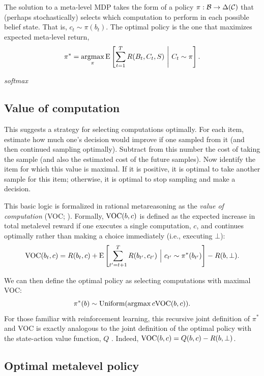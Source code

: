 The solution to a meta-level MDP takes the form of a policy $\pi: \mathcal{B} \rightarrow \Delta(\mathcal{C})$ that (perhaps stochastically) selects which computation to perform in each possible belief state. That is, $c_t \sim \pi(b_t)$. The optimal policy is the one that maximizes expected meta-level return,
%
\begin{equation}\label{eq:optimal-policy}
  \pi^* = \operatorname*{argmax}_\pi \operatorname*{E} \left[ 
    \sum_{t=1}^T R(B_t, C_t, S)
   \ \middle\vert\ 
    C_t \sim \pi
   \right].
\end{equation}



 \emph{softmax}

\subsection{Value of computation}

This suggests a strategy for selecting computations optimally. For each item, estimate how much one's decision would improve if one sampled from it (and then continued sampling optimally). Subtract from this number the cost of taking the sample (and also the estimated cost of the future samples). Now identify the item for which this value is maximal. If it is positive, it is optimal to take another sample for this item; otherwise, it is optimal to stop sampling and make a decision.

This basic logic is formalized in rational metareasoning as the \textit{value of computation} (VOC; \citealp{russell1991principles}). Formally, $\text{VOC}(b, c)$ is defined as the expected increase in total metalevel reward if one executes a single computation, $c$, and continues optimally rather than making a choice immediately (i.e., executing $\bot$):
$$
\text{VOC}(b_t, c) = R(b_t, c) + \operatorname*{E} \left[
  \sum_{t'=t+1}^T R(b_{t'}, c_{t'})\ \Big\vert\ c_{t'} \sim \pi^*(b_{t'}) 
\right] - R(b, \bot).
$$

We can then define the optimal policy as selecting computations with maximal VOC:
$$
\pi^*(b) \sim \text{Uniform}(\operatorname*{argmax}{c} \text{VOC}(b, c)).
$$
For those familiar with reinforcement learning, this recursive joint definition of $\pi^*$ and VOC is exactly analogous to the joint definition of the optimal policy with the state-action value function, $Q$ \citep{sutton2018reinforcement}. Indeed, $\text{VOC}(b, c) = Q(b, c) - R(b, \bot)$. 

\subsection{Optimal metalevel policy}

